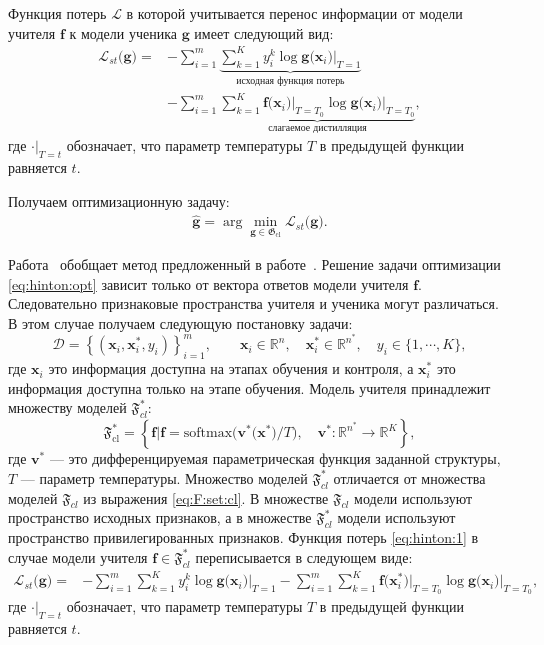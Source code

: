 Функция потерь $\mathcal{L}$ в которой учитывается перенос информации от модели учителя $\mathbf{f}$ к модели ученика $\mathbf{g}$ имеет следующий вид:
\[
\label{eq:hinton:1}
\begin{aligned}
   \mathcal{L}_{st}\bigr(\mathbf{g}\bigr) = &-\sum_{i=1}^{m}\underbrace{{\sum_{k=1}^{K}y^k_i\log\mathbf{g}\bigr(\mathbf{x}_i\bigr)\bigr|_{T=1}}}_{\text{исходная функция потерь}}\\
   &-\sum_{i=1}^{m}\underbrace{{\sum_{k=1}^{K}\mathbf{f}\bigr(\mathbf{x}_i\bigr)\bigr|_{T=T_0}\log\mathbf{g}\bigr(\mathbf{x}_i\bigr)\bigr|_{T=T_0}}}_{\text{слагаемое дистилляция}},
\end{aligned}
\]
где $\cdot\bigr|_{T=t}$ обозначает, что параметр температуры $T$ в предыдущей функции равняется $t$.

Получаем оптимизационную задачу:
\[
\label{eq:hinton:opt}
\begin{aligned}
   \hat{\mathbf{g}} = \arg\min_{\mathbf{g} \in \mathfrak{G}_{\text{cl}}} \mathcal{L}_{st}\bigr(\mathbf{g}\bigr).
\end{aligned}
\]

Работа~\cite{Lopez2016} обобщает метод предложенный в работе~\cite{Hinton2015}. Решение задачи оптимизации \eqref{eq:hinton:opt} зависит только от вектора ответов модели учителя $\mathbf{f}$. Следовательно признаковые пространства учителя и ученика могут различаться. В этом случае получаем следующую постановку задачи:
\[
    \mathcal{D} = \left\{\left(\mathbf{x}_i, \mathbf{x}^*_i, y_i\right)\right\}_{i=1}^{m}, \qquad \mathbf{x}_i \in \mathbb{R}^{n}, \quad \mathbf{x}^*_i \in \mathbb{R}^{n^*}, \quad y_i \in \{1, \cdots, K\},
\]
где $\mathbf{x}_i$ это информация доступна на этапах обучения и контроля, а $\mathbf{x}^*_i$ это информация доступна только на этапе обучения. Модель учителя принадлежит множеству моделей $\mathfrak{F}_{cl}^*$:
\[
\label{eq:F:set:cl:priv}
\mathfrak{F}_{\text{cl}}^* = \left\{\mathbf{f}| \mathbf{f} = \text{softmax}\bigr(\mathbf{v}^*\bigr(\mathbf{x}^*\bigr)/T\bigr), \quad \mathbf{v}^*: \mathbb{R}^{n^*} \to \mathbb{R}^K \right\},
\]
где $\mathbf{v}^*$ --- это дифференцируемая параметрическая функция заданной структуры, $T$ --- параметр температуры. Множество моделей $\mathfrak{F}_{cl}^*$ отличается от множества моделей $\mathfrak{F}_{cl}$ из выражения \eqref{eq:F:set:cl}. В множестве $\mathfrak{F}_{cl}$ модели используют пространство исходных признаков, а в множестве $\mathfrak{F}_{cl}^*$ модели используют пространство привилегированных признаков. Функция потерь \eqref{eq:hinton:1} в случае модели учителя $\mathbf{f} \in \mathfrak{F}_{cl}^*$ переписывается в следующем виде:
\[
\label{eq:hinton:L:new}
\begin{aligned}
   \mathcal{L}_{st}\bigr(\mathbf{g}\bigr) = &-\sum_{i=1}^{m}{\sum_{k=1}^{K}y^k_i\log\mathbf{g}\bigr(\mathbf{x}_i\bigr)\bigr|_{T=1}}-\sum_{i=1}^{m}{\sum_{k=1}^{K}\mathbf{f}\bigr(\mathbf{x}^*_i\bigr)\bigr|_{T=T_0}\log\mathbf{g}\bigr(\mathbf{x}_i\bigr)\bigr|_{T=T_0}},
\end{aligned}
\]
где $\cdot\bigr|_{T=t}$ обозначает, что параметр температуры $T$ в предыдущей функции равняется $t$.


